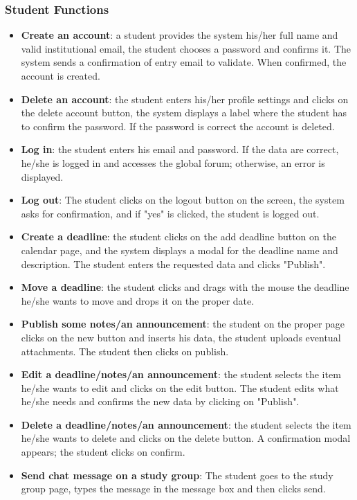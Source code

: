 \documentclass{article}
\begin{document}
\subsubsection{Student Functions}
\begin{itemize}
    \item \textbf{Create an account}: a student provides the system his/her full name and valid institutional email, the student chooses a password and confirms it. The system sends a confirmation of entry email to validate. When confirmed, the account is created.
    \item \textbf{Delete an account}: the student enters his/her profile settings and clicks on the delete account button, the system displays a label where the student has to confirm the password. If the password is correct the account is deleted.
    \item \textbf{Log in}: the student enters his email and password. If the data are correct, he/she is logged in and accesses the global forum; otherwise, an error is displayed.
    \item \textbf{Log out}: The student clicks on the logout button on the screen, the system asks for confirmation, and if "yes" is clicked, the student is logged out.
    \item \textbf{Create a deadline}: the student clicks on the add deadline button on the calendar page, and the system displays a modal for the deadline name and description. The student enters the requested data and clicks "Publish".
    \item \textbf{Move a deadline}: the student clicks and drags with the mouse the deadline he/she wants to move and drops it on the proper date.
    \item \textbf{Publish some notes/an announcement}: the student on the proper page clicks on the new button and inserts his data, the student uploads eventual attachments. The student then clicks on publish.
    \item \textbf{Edit a deadline/notes/an announcement}:  the student selects the item he/she wants to edit and clicks on the edit button. The student edits what he/she needs and confirms the new data by clicking on "Publish".
    \item \textbf{Delete a deadline/notes/an announcement}: the student selects the item he/she wants to delete and clicks on the delete button. A confirmation modal appears; the student clicks on confirm.
    \item \textbf{Send chat message on a study group}: The student goes to the study group page, types the message in the message box and then clicks send.

\end{itemize}
\end{document}
